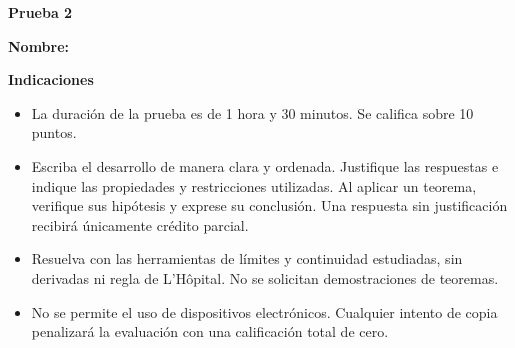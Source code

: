 \documentclass[10pt,a5paper]{article}
\begin{document}
\begin{center}
  {\color{Azul}\large\bfseries Prueba 2}
\end{center}

\noindent\textbf{Nombre:} \hrulefill

\medskip
\noindent\textbf{Indicaciones}
\begin{itemize}
  \item La duración de la prueba es de 1 hora y 30 minutos. Se califica sobre 10 puntos.
  \item Escriba el desarrollo de manera clara y ordenada. Justifique las respuestas e indique las propiedades y restricciones utilizadas. Al aplicar un teorema, verifique sus hipótesis y exprese su conclusión. Una respuesta sin justificación recibirá únicamente crédito parcial.
  \item Resuelva con las herramientas de límites y continuidad estudiadas, sin derivadas ni regla de L'Hôpital. No se solicitan demostraciones de teoremas.
  \item No se permite el uso de dispositivos electrónicos. Cualquier intento de copia penalizará la evaluación con una calificación total de cero.
\end{itemize}
\end{document}

